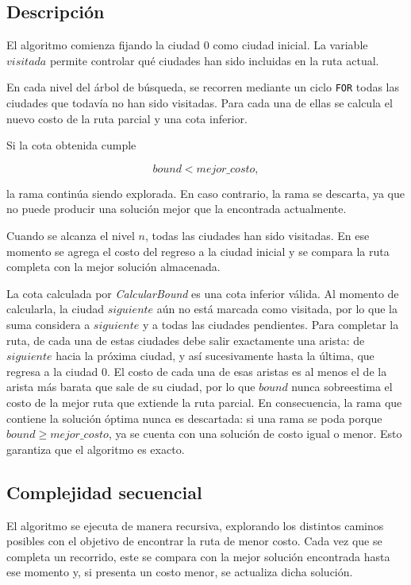 \documentclass[12pt,a4paper]{article}
\begin{document}
\subsection{Descripción}

El algoritmo comienza fijando la ciudad $0$ como ciudad inicial. La variable
$visitada$ permite controlar qué ciudades han sido incluidas en la ruta
actual.

En cada nivel del árbol de búsqueda, se recorren mediante un ciclo
\texttt{FOR} todas las ciudades que todavía no han sido visitadas. Para
cada una de ellas se calcula el nuevo costo de la ruta parcial y una cota
inferior.

Si la cota obtenida cumple

\[
bound < mejor\_costo,
\]

la rama continúa siendo explorada. En caso contrario, la rama se descarta,
ya que no puede producir una solución mejor que la encontrada actualmente.

Cuando se alcanza el nivel $n$, todas las ciudades han sido visitadas. En
ese momento se agrega el costo del regreso a la ciudad inicial y se compara
la ruta completa con la mejor solución almacenada.

La cota calculada por \textit{CalcularBound} es una cota inferior válida. Al
momento de calcularla, la ciudad $siguiente$ aún no está marcada como visitada,
por lo que la suma considera a $siguiente$ y a todas las ciudades pendientes.
Para completar la ruta, de cada una de estas ciudades debe salir exactamente una
arista: de $siguiente$ hacia la próxima ciudad, y así sucesivamente hasta la
última, que regresa a la ciudad $0$. El costo de cada una de esas aristas es al
menos el de la arista más barata que sale de su ciudad, por lo que $bound$ nunca
sobreestima el costo de la mejor ruta que extiende la ruta parcial. En
consecuencia, la rama que contiene la solución óptima nunca es descartada: si una
rama se poda porque $bound \geq mejor\_costo$, ya se cuenta con una solución de
costo igual o menor. Esto garantiza que el algoritmo es exacto.

\subsection{Complejidad secuencial}
\label{sec:compl_sec}

El algoritmo se ejecuta de manera recursiva, explorando los distintos caminos
posibles con el objetivo de encontrar la ruta de menor costo. Cada vez que se
completa un recorrido, este se compara con la mejor solución encontrada hasta ese
momento y, si presenta un costo menor, se actualiza dicha solución.
\end{document}
